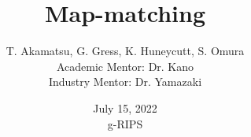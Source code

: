 \documentclass[aspectratio=169, bigfiles]{beamer}
\title[Mitsubishi A]{Map-matching}
\author[T. Akamatsu, G. Gress, K. Huneycutt, S. Omura]{T. Akamatsu, G. Gress, K. Huneycutt, S. Omura \\
Academic Mentor: Dr. Kano \\
Industry Mentor: Dr. Yamazaki}
\date[15/07] %
{\quad July 15, 2022 \\  \quad g-RIPS}
\begin{document}











\begin{frame}
\titlepage


\end{frame}



\end{document}
